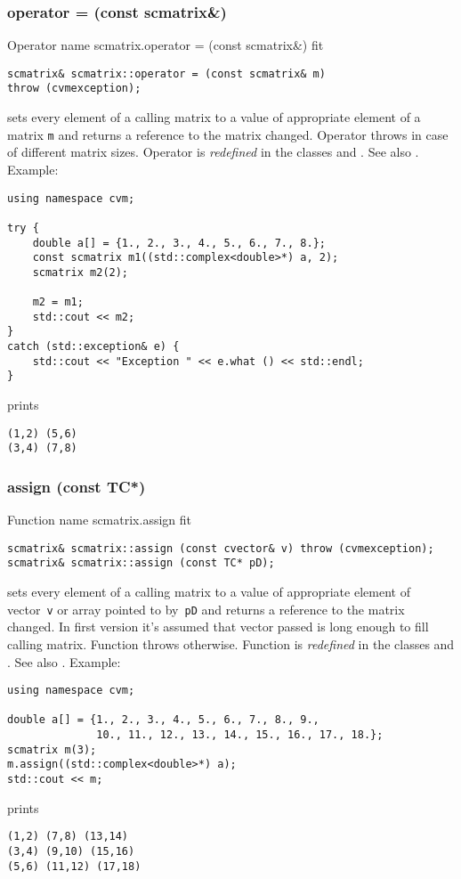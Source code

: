 \subsubsection{operator = (const scmatrix\&)}
Operator%
\pdfdest name {scmatrix.operator = (const scmatrix&)} fit
\begin{verbatim}
scmatrix& scmatrix::operator = (const scmatrix& m)
throw (cvmexception);
\end{verbatim}
sets  every element of a calling matrix to a value of
appropriate element of a matrix \verb"m"
and returns a reference to
the matrix changed.
Operator throws  
in case of different matrix sizes.
Operator is \emph{redefined} in the classes
and .
See also .
Example:
\begin{Verbatim}
using namespace cvm;

try {
    double a[] = {1., 2., 3., 4., 5., 6., 7., 8.};
    const scmatrix m1((std::complex<double>*) a, 2);
    scmatrix m2(2);

    m2 = m1;
    std::cout << m2;
}
catch (std::exception& e) {
    std::cout << "Exception " << e.what () << std::endl;
}
\end{Verbatim}
prints
\begin{Verbatim}
(1,2) (5,6)
(3,4) (7,8)
\end{Verbatim}
\newpage





\subsubsection{assign (const TC*)}
Function%
\pdfdest name {scmatrix.assign} fit
\begin{verbatim}
scmatrix& scmatrix::assign (const cvector& v) throw (cvmexception);
scmatrix& scmatrix::assign (const TC* pD);
\end{verbatim}
sets every element of a calling matrix to a value of
appropriate element of  vector~\verb'v'
or  array pointed to by~\verb"pD"
and returns a reference to
the matrix changed.
In first version it's assumed that vector passed is long
enough to fill calling matrix. Function throws  
otherwise.
Function is \emph{redefined} in the classes
and .
See also .
Example:
\begin{Verbatim}
using namespace cvm;

double a[] = {1., 2., 3., 4., 5., 6., 7., 8., 9.,
              10., 11., 12., 13., 14., 15., 16., 17., 18.};
scmatrix m(3);
m.assign((std::complex<double>*) a);
std::cout << m;
\end{Verbatim}
prints
\begin{Verbatim}
(1,2) (7,8) (13,14)
(3,4) (9,10) (15,16)
(5,6) (11,12) (17,18)
\end{Verbatim}
\newpage




